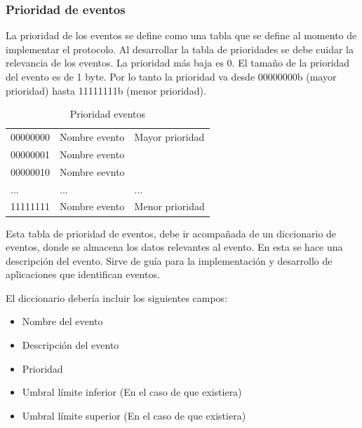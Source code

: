 \subsubsection{Prioridad de eventos}
La prioridad de los eventos se define como una tabla que se define al momento de implementar el protocolo. Al desarrollar la tabla de prioridades se debe cuidar la relevancia de los eventos. La prioridad más baja es 0. El tamaño de la prioridad del evento es de 1 byte. Por lo tanto la prioridad va desde 00000000b (mayor prioridad) hasta 11111111b (menor prioridad).

\begin{table}[h!]
  \centering
  \caption{Prioridad eventos}
  \label{table:prioridad_eventos}
  \begin{tabular}{|l|l|l}
    \cline{1-2}
    00000000 & Nombre evento & Mayor prioridad \\\cline{1-2}
    00000001 & Nombre evento & \\\cline{1-2}
    00000010 & Nombre eevnto & \\\cline{1-2}
    ... & ... & ... \\\cline{1-2}
    11111111 & Nombre evento & Menor prioridad \\\cline{1-2}
  \end{tabular}    
\end{table}

Esta tabla de prioridad de eventos, debe ir acompañada de un diccionario de eventos, donde se almacena los datos relevantes al evento. En esta se hace una descripción del evento. Sirve de guía para la implementación y desarrollo de aplicaciones que identifican eventos.

El diccionario debería incluir los siguientes campos:
\begin{itemize}
\item Nombre del evento
\item Descripción del evento
\item Prioridad
\item Umbral límite inferior (En el caso de que existiera)
\item Umbral límite superior (En el caso de que existiera)
\end{itemize}




